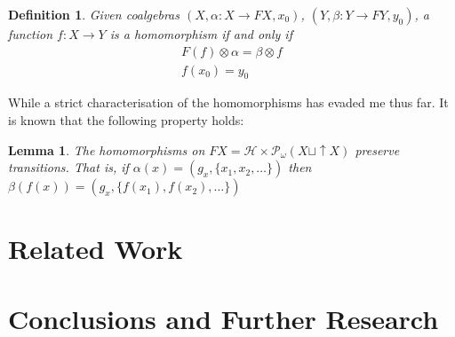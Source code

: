 \documentclass[12pt]{article}
\newtheorem{definition}{Definition}[section]
\newtheorem{lemma}{Lemma}[section]
\newcommand{\1}{\mathbbm{1}}
\renewcommand{\H}{\mathcal{H}}
\newcommand{\finP}{\mathcal{P}_{\omega}}
\begin{document}
\begin{definition}
    Given coalgebras $(X, \alpha: X\to FX, x_0)$, $(Y, \beta: Y\to FY, y_0)$, a function $f: X\to Y$ is a homomorphism if and only if
    \begin{align*}
        F(f)\otimes \alpha = \beta \otimes f\\
        f(x_0) = y_0
    \end{align*}
\end{definition}

While a strict characterisation of the homomorphisms has evaded me thus far. It is known that the following property holds:

\begin{lemma}
    The homomorphisms on $FX = \H \times \finP(X \sqcup \uparrow X)$ preserve transitions. That is, if $\alpha (x) = (g_x, \{x_1, x_2, \dots\})$ then $\beta(f(x)) = (g_x, \{f(x_1), f(x_2), \dots\})$
\end{lemma}

\newpage
\section{Related Work}\label{relatedwork}

\section{Conclusions and Further Research}\label{conclusions}





\end{document}
